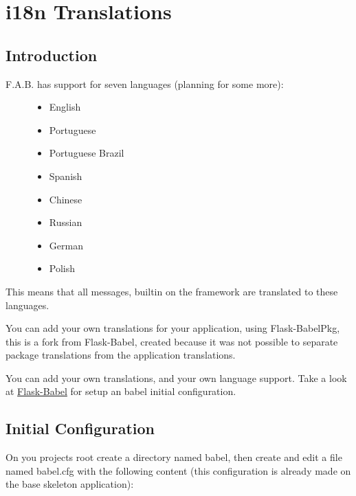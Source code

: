 \documentclass[letterpaper,10pt,english]{sphinxmanual}
\begin{document}
\section{i18n Translations}
\label{i18n:i18n-translations}\label{i18n::doc}

\subsection{Introduction}
\label{i18n:introduction}\begin{description}
\item[{F.A.B. has support for seven languages (planning for some more):}] \leavevmode\begin{itemize}
\item {} 
English

\item {} 
Portuguese

\item {} 
Portuguese Brazil

\item {} 
Spanish

\item {} 
Chinese

\item {} 
Russian

\item {} 
German

\item {} 
Polish

\end{itemize}

\end{description}

This means that all messages, builtin on the framework are translated to these languages.

You can add your own translations for your application, using Flask-BabelPkg, this is a fork from Flask-Babel,
created because it was not possible to separate package translations from the application translations.

You can add your own translations, and your own language support.
Take a look at \href{http://pythonhosted.org/Flask-Babel}{Flask-Babel} for setup an babel initial configuration.


\subsection{Initial Configuration}
\label{i18n:initial-configuration}
On you projects root create a directory named babel,
then create and edit a file named babel.cfg with the following content (this configuration is already made on the
base skeleton application):
\end{document}
